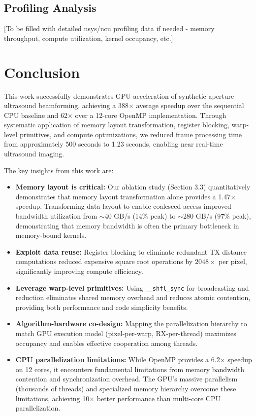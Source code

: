 \documentclass{article}
\begin{document}
\subsection{Profiling Analysis}

[To be filled with detailed nsys/ncu profiling data if needed - memory throughput, compute utilization, kernel occupancy, etc.]

\section{Conclusion}

This work successfully demonstrates GPU acceleration of synthetic aperture ultrasound beamforming, achieving a 388$\times$ average speedup over the sequential CPU baseline and 62$\times$ over a 12-core OpenMP implementation. Through systematic application of memory layout transformation, register blocking, warp-level primitives, and compute optimizations, we reduced frame processing time from approximately 500 seconds to 1.23 seconds, enabling near real-time ultrasound imaging.

The key insights from this work are:
\begin{itemize}
    \item \textbf{Memory layout is critical:} Our ablation study (Section 3.3) quantitatively demonstrates that memory layout transformation alone provides a 1.47$\times$ speedup. Transforming data layout to enable coalesced access improved bandwidth utilization from $\sim$40 GB/s (14\% peak) to $\sim$280 GB/s (97\% peak), demonstrating that memory bandwidth is often the primary bottleneck in memory-bound kernels.

    \item \textbf{Exploit data reuse:} Register blocking to eliminate redundant TX distance computations reduced expensive square root operations by $2048\times$ per pixel, significantly improving compute efficiency.

    \item \textbf{Leverage warp-level primitives:} Using \texttt{\_\_shfl\_sync} for broadcasting and reduction eliminates shared memory overhead and reduces atomic contention, providing both performance and code simplicity benefits.

    \item \textbf{Algorithm-hardware co-design:} Mapping the parallelization hierarchy to match GPU execution model (pixel-per-warp, RX-per-thread) maximizes occupancy and enables effective cooperation among threads.

    \item \textbf{CPU parallelization limitations:} While OpenMP provides a 6.2$\times$ speedup on 12 cores, it encounters fundamental limitations from memory bandwidth contention and synchronization overhead. The GPU's massive parallelism (thousands of threads) and specialized memory hierarchy overcome these limitations, achieving 10$\times$ better performance than multi-core CPU parallelization.
\end{itemize}
\end{document}

